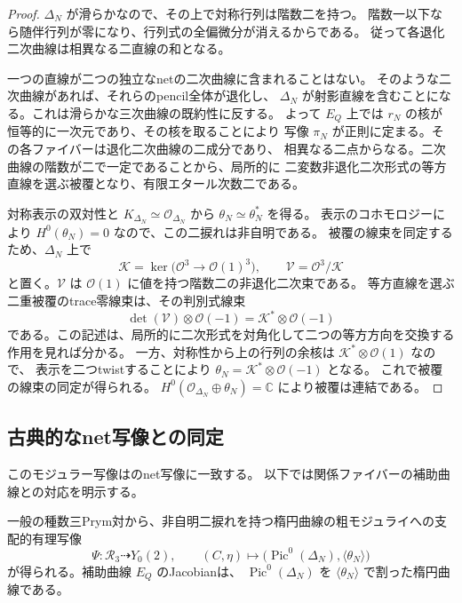 \begin{proof}
$\Delta_N$ が滑らかなので、その上で対称行列は階数二を持つ。
階数一以下なら随伴行列が零になり、行列式の全偏微分が消えるからである。
従って各退化二次曲線は相異なる二直線の和となる。

一つの直線が二つの独立なnetの二次曲線に含まれることはない。
そのような二次曲線があれば、それらのpencil全体が退化し、
$\Delta_N$ が射影直線を含むことになる。これは滑らかな三次曲線の既約性に反する。
よって $E_Q$ 上では $r_N$ の核が恒等的に一次元であり、その核を取ることにより
写像 $\pi_N$ が正則に定まる。その各ファイバーは退化二次曲線の二成分であり、
相異なる二点からなる。二次曲線の階数が二で一定であることから、局所的に
二変数非退化二次形式の等方直線を選ぶ被覆となり、有限エタール次数二である。

対称表示の双対性と $K_{\Delta_N}\simeq\mathcal O_{\Delta_N}$ から
$\theta_N\simeq\theta_N^*$ を得る。
表示のコホモロジーにより $H^0(\theta_N)=0$ なので、この二捩れは非自明である。
被覆の線束を同定するため、$\Delta_N$ 上で
\[
 \mathscr K=\ker\bigl(\mathcal O^3\longrightarrow\mathcal O(1)^3\bigr),
 \qquad \mathscr V=\mathcal O^3/\mathscr K
\]
と置く。$\mathscr V$ は $\mathcal O(1)$ に値を持つ階数二の非退化二次束である。
等方直線を選ぶ二重被覆のtrace零線束は、その判別式線束
\[
 \det(\mathscr V)\otimes\mathcal O(-1)
 =\mathscr K^*\otimes\mathcal O(-1)
\]
である。この記述は、局所的に二次形式を対角化して二つの等方方向を交換する作用を見れば分かる。
一方、対称性から上の行列の余核は $\mathscr K^*\otimes\mathcal O(1)$ なので、
表示を二つtwistすることにより
$\theta_N=\mathscr K^*\otimes\mathcal O(-1)$ となる。
これで被覆の線束の同定が得られる。
$H^0(\mathcal O_{\Delta_N}\oplus\theta_N)=\mathbb C$ により被覆は連結である。
\end{proof}

\subsection{古典的なnet写像との同定}
このモジュラー写像は\cite[Remark~4.1]{DolgachevRationality2008}のnet写像に一致する。
以下では関係ファイバーの補助曲線との対応を明示する。

\begin{corollary}[次数二同種写像のモジュライへの写像]
\label{cor:prym-y0two-v27}
一般の種数三Prym対から、非自明二捩れを持つ楕円曲線の粗モジュライへの支配的有理写像
\[
 \Psi:\mathcal R_3\dashrightarrow Y_0(2),\qquad
 (C,\eta)\longmapsto
 \bigl(\operatorname{Pic}^0(\Delta_N),\langle\theta_N\rangle\bigr)
\]
が得られる。補助曲線 $E_Q$ のJacobianは、
$\operatorname{Pic}^0(\Delta_N)$ を $\langle\theta_N\rangle$ で割った楕円曲線である。
\end{corollary}

